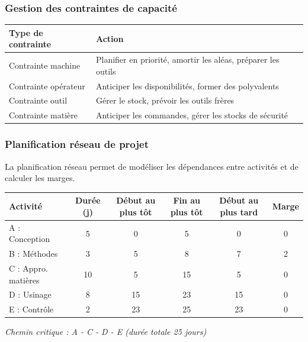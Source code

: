 \documentclass{article}
\begin{document}
\begin{table}[h]
\subsubsection{Gestion des contraintes de capacité}

\begin{table}[h]
\centering
\begin{tabular}{|l|l|}
\hline
\textbf{Type de contrainte} & \textbf{Action} \\
\hline
Contrainte machine & Planifier en priorité, amortir les aléas, préparer les outils \\
Contrainte opérateur & Anticiper les disponibilités, former des polyvalents \\
Contrainte outil & Gérer le stock, prévoir les outils frères \\
Contrainte matière & Anticiper les commandes, gérer les stocks de sécurité \\
\hline
\end{tabular}
\end{table}

\subsubsection{Planification réseau de projet}

La planification réseau permet de modéliser les dépendances entre activités et de calculer les marges.

\begin{tcolorbox}[colback=blueclair, colframe=blue!70!black, title=Exemple de planification réseau]
\begin{center}
\begin{tabular}{lccccc}
\hline
\textbf{Activité} & \textbf{Durée (j)} & \textbf{Début au plus tôt} & \textbf{Fin au plus tôt} & \textbf{Début au plus tard} & \textbf{Marge} \\
\hline
A : Conception & 5 & 0 & 5 & 0 & 0 \\
B : Méthodes & 3 & 5 & 8 & 7 & 2 \\
C : Appro. matières & 10 & 5 & 15 & 5 & 0 \\
D : Usinage & 8 & 15 & 23 & 15 & 0 \\
E : Contrôle & 2 & 23 & 25 & 23 & 0 \\
\hline
\end{tabular}
\end{center}
\textit{Chemin critique : A - C - D - E (durée totale 25 jours)}
\end{tcolorbox}


\end{table}
\end{document}
